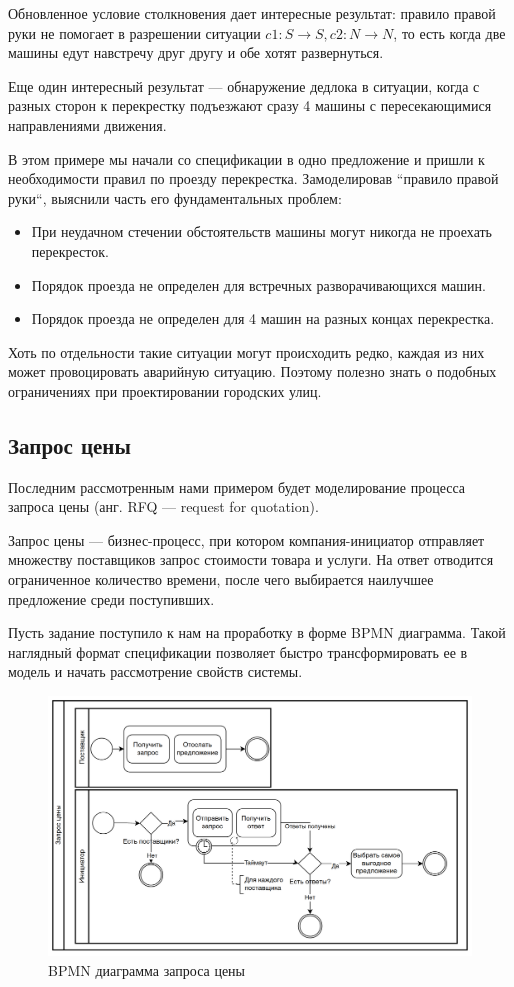\documentclass[14pt, openany]{report}
\begin{document}
Обновленное условие столкновения дает интересные результат: правило правой руки не помогает в разрешении ситуации \(c1: S \rightarrow S, c2: N \rightarrow N \), то есть когда две машины едут навстречу друг другу и обе хотят развернуться. 


Еще один интересный результат --- обнаружение дедлока в ситуации, когда с разных сторон к перекрестку подъезжают сразу 4 машины с пересекающимися направлениями движения.

В этом примере мы начали со спецификации в одно предложение и пришли к необходимости правил по проезду перекрестка. Замоделировав ``правило правой руки``, выяснили часть его фундаментальных проблем:
\begin{itemize}
  \item При неудачном стечении обстоятельств машины могут никогда не проехать перекресток.
  \item Порядок проезда не определен для встречных разворачивающихся машин. 
  \item Порядок проезда не определен для 4 машин на разных концах перекрестка.
\end{itemize}

Хоть по отдельности такие ситуации могут происходить редко, каждая из них может провоцировать аварийную ситуацию. Поэтому полезно знать о подобных ограничениях при проектировании городских улиц.

\subsection{Запрос цены}
Последним рассмотренным нами примером будет моделирование процесса запроса цены (анг. RFQ --- request for quotation).

Запрос цены --- бизнес-процесс, при котором компания-инициатор отправляет множеству поставщиков запрос стоимости товара и услуги.  На ответ отводится ограниченное количество времени, после чего выбирается наилучшее предложение среди поступивших.

Пусть задание поступило к нам на проработку в форме BPMN диаграмма. Такой наглядный формат спецификации позволяет быстро трансформировать ее в модель и начать рассмотрение свойств системы.


\begin{figure}[h]
  \includegraphics[scale=0.2]{rfq}
  \caption{BPMN диаграмма запроса цены}
  \label{fig:rfq}
\end{figure}
\end{document}

